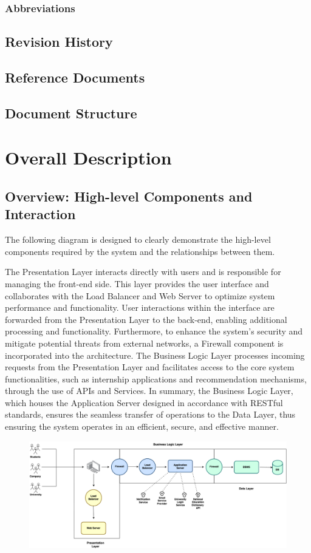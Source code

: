 \documentclass[a4paper,12pt]{article}
\begin{document}
\subsubsection{Abbreviations}
\subsection{Revision History}
\subsection{Reference Documents}
\subsection{Document Structure}

\section{Overall Description}
\subsection{Overview: High-level Components and Interaction}
The following diagram is designed to clearly demonstrate the high-level components required by the system and the relationships between them. 

 The Presentation Layer interacts directly with users and is responsible for managing the front-end side. This layer provides the user interface and collaborates with the Load Balancer and Web Server to optimize system performance and functionality. User interactions within the interface are forwarded from the Presentation Layer to the back-end, enabling additional processing and functionality. Furthermore, to enhance the system’s security and mitigate potential threats from external networks, a Firewall component is incorporated into the architecture. The Business Logic Layer processes incoming requests from the Presentation Layer and facilitates access to the core system functionalities, such as internship applications and recommendation mechanisms, through the use of APIs and Services. In summary, the Business Logic Layer, which houses the Application Server designed in accordance with RESTful standards, ensures the seamless transfer of operations to the Data Layer, thus ensuring the system operates in an efficient, secure, and effective manner.
\begin{figure}[H]
\centering
\includegraphics[scale = 0.40]{DD_figures/SingleDiagrams/overviewDiagram.png}
\end{figure}
\end{document}

